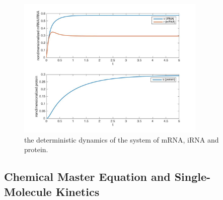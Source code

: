 \documentclass[fleqn,10pt]{wlscirep}
\begin{document}

\begin{figure}[ht]
\centering
\includegraphics[width=9cm]{deterdyn}
\caption{the deterministic dynamics of the system of mRNA, iRNA and protein.}
\label{fig:deterdyn}
\end{figure}

\subsection*{Chemical Master Equation and Single-Molecule Kinetics}
\end{document}
